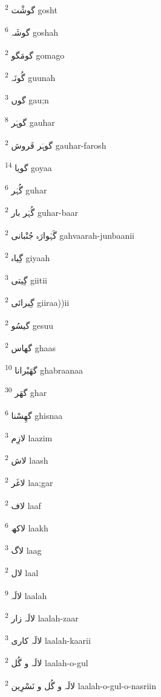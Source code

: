 \documentclass[12pt]{article}
\begin{document}
\begin{RTL}
\begin{multicols}{5}
{\ur گوشْت}   \textsuperscript{2} gosht

{\ur گوشَہ}   \textsuperscript{6} goshah

{\ur گومَگو}   \textsuperscript{2} gomago

{\ur گُونَہ}   \textsuperscript{2} guunah

{\ur گوں}   \textsuperscript{3} gau;n

{\ur گوہَر}   \textsuperscript{8} gauhar

{\ur گوہَر فَروش}   \textsuperscript{2} gauhar-farosh

{\ur گویا}   \textsuperscript{14} goyaa

{\ur گُہَر}   \textsuperscript{6} guhar

{\ur گُہَر بار}   \textsuperscript{2} guhar-baar

{\ur گَہْوارَہ جُنْبانی}   \textsuperscript{2} gahvaarah-junbaanii

{\ur گِیاہ}   \textsuperscript{2} giyaah

{\ur گِیتی}   \textsuperscript{3} giitii

{\ur گِیرائی}   \textsuperscript{2} giiraa))ii

{\ur گیسُو}   \textsuperscript{2} gesuu

{\ur گھاس}   \textsuperscript{2} ghaas

{\ur گھَبْرانا}   \textsuperscript{10} ghabraanaa

{\ur گھَر}   \textsuperscript{30} ghar

{\ur گھِسْنا}   \textsuperscript{6} ghisnaa

{\ur لازِم}   \textsuperscript{3} laazim

{\ur لاش}   \textsuperscript{2} laash

{\ur لاغَر}   \textsuperscript{2} laa;gar

{\ur لاف}   \textsuperscript{2} laaf

{\ur لاکھ}   \textsuperscript{6} laakh

{\ur لاگ}   \textsuperscript{3} laag

{\ur لال}   \textsuperscript{2} laal

{\ur لالَہ}   \textsuperscript{9} laalah

{\ur لالَہ زار}   \textsuperscript{2} laalah-zaar

{\ur لالَہ کاری}   \textsuperscript{3} laalah-kaarii

{\ur لالَہ و گُل}   \textsuperscript{2} laalah-o-gul

{\ur لالَہ و گُل و نَسْرِین}   \textsuperscript{2} laalah-o-gul-o-nasriin


\end{multicols}
\end{RTL}
\end{document}
